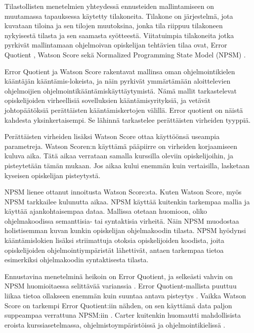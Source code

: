 \documentclass[finnish,twoside,openright]{HYgraduMLDS}
\begin{document}
Tilastollisten menetelmien yhteydessä ennusteiden mallintamiseen on muutamassa tapauksessa käytetty tilakoneita. Tilakone on järjestelmä, jota kuvataan tiloina ja sen tilojen muutoksina, jonka tila riippuu tilakoneen nykyisestä tilasta ja sen saamasta syötteestä. Viitatuimpia tilakoneita jotka pyrkivät mallintamaan ohjelmoivan opiskelijan tehtävien tilaa ovat, Error Quotient \cite{jadud2006methods}, Watson Score \cite{watson2013predicting} sekä Normalized Programming State Model (NPSM) \cite{carter2015normalized}. 

Error Quotient ja Watson Score rakentavat mallinsa oman ohjelmointikielen kääntäjän kääntämis-lokeista, ja näin pyrkivät ymmärtämään aloittelevien ohjelmoijien ohjelmointikääntämiskäyttäytymistä. Nämä mallit tarkastelevat opiskelijoiden virheellisiä sovelluksien kääntämisyrityksiä, ja vetävät johtopäätöksiä perättäisten kääntämiskertojen välillä. Error quotient on näistä kahdesta yksinkertaisempi. Se lähinnä tarkastelee perättäisten virheiden tyyppiä. 

Perättäisten virheiden lisäksi Watson Score ottaa käyttöönsä useampia parametreja. Watson Scoren:n käyttämä pääpiirre on virheiden korjaamiseen kuluva aika. Tätä aikaa verrataan samalla kurssilla oleviin opiskelijoihin, ja pisteytetään tämän mukaan. Jos aikaa kului enemmän kuin vertaisilla, lasketaan kyseisen opiskelijan pisteytystä.

NPSM lienee ottanut innoitusta Watson Score:sta. Kuten Watson Score, myös NPSM tarkkailee kulunutta aikaa. NPSM käyttää kuitenkin tarkempaa mallia ja käyttää ajankohtaisempaa dataa. Mallissa otetaan huomioon, oliko ohjelmakoodissa semanttisia- tai syntaktisia virheitä. Näin NPSM muodostaa holistisemman kuvan kunkin opiskelijan ohjelmakoodin tilasta. NPSM hyödynsi kääntämislokien lisäksi striimattuja otoksia opiskelijoiden koodista, joita opiskelijoiden ohjelmointiympäristät lähettivät, antaen tarkempaa tietoa esimerkiksi ohjelmakoodin syntaktisesta tilasta. 

Ennustavina menetelminä heikoin on Error Quotient, ja selkeästi vahvin on NPSM huomioitaessa selittävää varianssia \cite{carter2015normalized}. Error Quotient-mallista puuttuu liikaa tietoa ollakseen enemmän kuin suuntaa antava pisteytys \cite{jadud2006methods}. Vaikka Watson Score on tarkempi Error Quotient:iin nähden, on sen käyttämä data paljon suppeampaa verrattuna NPSM:iin \cite{carter2015normalized}. Carter kuitenkin huomautti mahdollisista eroista kurssiasetelmassa, ohjelmistoympäristöissä ja ohjelmointikielissä \cite{carter2015normalized}. 
\end{document}
